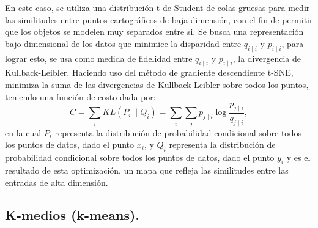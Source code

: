 \documentclass[12pt,letterpaper,oneside,openright]{book}
\begin{document}
	En este caso, se utiliza una distribución t de Student de colas gruesas para medir las similitudes entre puntos cartográficos de baja dimensión, con el fin de permitir que los objetos se modelen muy separados entre si. 
	Se busca una representación bajo dimensional de los datos que minimice la disparidad entre $q_{i \mid i}$ y $p_{i \mid i}$, para lograr esto, se usa como medida de fidelidad entre $q_{i \mid i}$ y $p_{i \mid i}$, la divergencia de Kullback-Leibler. Haciendo uso del método de gradiente descendiente t-SNE, minimiza la suma de las divergencias de Kullback-Leibler sobre todos los puntos, teniendo una función de costo dada por: 
	\begin{equation}
		\label{eq:func_costo}
		C = \sum_i KL(P_i\|Q_i)=\sum_i\sum_j p_{j\mid i}\log\frac{p_{j\mid i}}{q_{j\mid i}},
	\end{equation}
	en la cual $P_i$ representa la distribución de probabilidad condicional sobre todos los puntos de datos, dado el punto $x_i$, y $Q_i$ representa la distribución de probabilidad condicional sobre todos los puntos de datos, dado el punto $y_i$ y es el resultado de esta optimización, un mapa que refleja las similitudes entre las entradas de alta dimensión.
	
\subsection{K-medios (k-means).}
\end{document}
